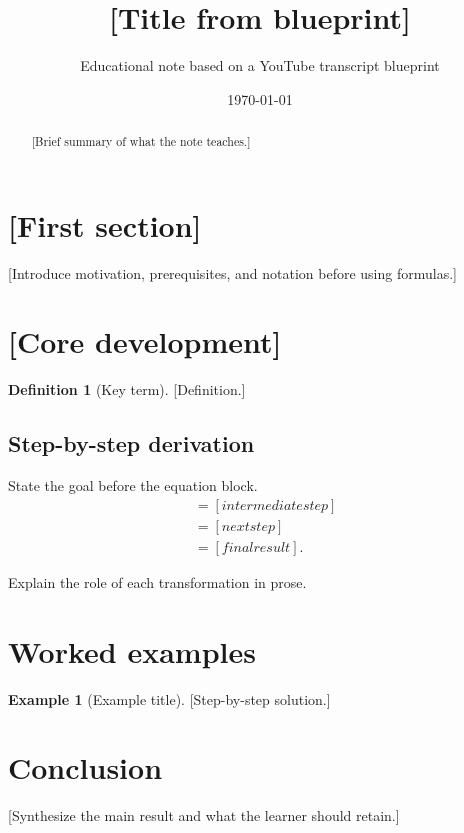 \documentclass[11pt]{article}
\title{[Title from blueprint]}
\author{Educational note based on a YouTube transcript blueprint}
\date{\today}
\theoremstyle{definition}
\newtheorem{definition}{Definition}[section]
\newtheorem{example}{Example}[section]
\theoremstyle{plain}
\begin{document}
\maketitle

\begin{abstract}
[Brief summary of what the note teaches.]
\end{abstract}

\tableofcontents
\newpage

\section{[First section]}

[Introduce motivation, prerequisites, and notation before using formulas.]

\section{[Core development]}

\begin{definition}[Key term]
[Definition.]
\end{definition}

\begin{intuitionbox}
\end{intuitionbox}

\subsection{Step-by-step derivation}

State the goal before the equation block.
\begin{align}
  [starting point]
    &= [intermediate step] \\
    &= [next step] \\
    &= [final result].
\end{align}

Explain the role of each transformation in prose.

\begin{resultbox}
\end{resultbox}

\section{Worked examples}

\begin{example}[Example title]
[Step-by-step solution.]
\end{example}

\section{Conclusion}

[Synthesize the main result and what the learner should retain.]
\end{document}
